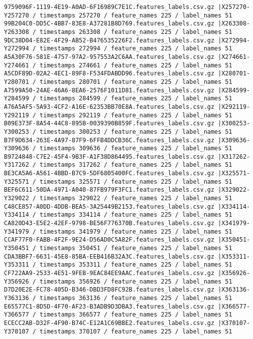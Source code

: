 \documentclass{UoNMCHA}
\numberwithin{equation}{section}
\begin{document}
\begin{lstlisting}
9759096F-1119-4E19-A0AD-6F16989C7E1C.features_labels.csv.gz |X257270-Y257270 / timestamps 257270 / feature_names 225 / label_names 51
99B204C0-DD5C-4BB7-83E8-A37281B8D769.features_labels.csv.gz |X263308-Y263308 / timestamps 263308 / feature_names 225 / label_names 51
9DC38D04-E82E-4F29-AB52-B476535226F2.features_labels.csv.gz |X272994-Y272994 / timestamps 272994 / feature_names 225 / label_names 51
A5A30F76-581E-4757-97A2-957553A2C6AA.features_labels.csv.gz |X274661-Y274661 / timestamps 274661 / feature_names 225 / label_names 51
A5CDF89D-02A2-4EC1-89F8-F534FDABDD96.features_labels.csv.gz |X280701-Y280701 / timestamps 280701 / feature_names 225 / label_names 51
A7599A50-24AE-46A6-8EA6-2576F1011D81.features_labels.csv.gz |X284599-Y284599 / timestamps 284599 / feature_names 225 / label_names 51
A76A5AF5-5A93-4CF2-A16E-62353BB70E8A.features_labels.csv.gz |X292119-Y292119 / timestamps 292119 / feature_names 225 / label_names 51
B09E373F-8A54-44C8-895B-0039390B859F.features_labels.csv.gz |X300253-Y300253 / timestamps 300253 / feature_names 225 / label_names 51
B7F9D634-263E-4A97-87F9-6FFB4DDCB36C.features_labels.csv.gz |X309636-Y309636 / timestamps 309636 / feature_names 225 / label_names 51
B9724848-C7E2-45F4-9B3F-A1F38D864495.features_labels.csv.gz |X317262-Y317262 / timestamps 317262 / feature_names 225 / label_names 51
BE3CA5A6-A561-4BBD-B7C9-5DF6805400FC.features_labels.csv.gz |X325571-Y325571 / timestamps 325571 / feature_names 225 / label_names 51
BEF6C611-50DA-4971-A040-87FB979F3FC1.features_labels.csv.gz |X329022-Y329022 / timestamps 329022 / feature_names 225 / label_names 51
C48CE857-A0DD-4DDB-BEA5-3A25449B2153.features_labels.csv.gz |X334114-Y334114 / timestamps 334114 / feature_names 225 / label_names 51
CA820D43-E5E2-42EF-9798-BE56F776370B.features_labels.csv.gz |X341979-Y341979 / timestamps 341979 / feature_names 225 / label_names 51
CCAF77F0-FABB-4F2F-9E24-D56AD0C5A82F.features_labels.csv.gz |X350451-Y350451 / timestamps 350451 / feature_names 225 / label_names 51
CDA3BBF7-6631-45E8-85BA-EEB416B32A3C.features_labels.csv.gz |X353311-Y353311 / timestamps 353311 / feature_names 225 / label_names 51
CF722AA9-2533-4E51-9FEB-9EAC84EE9AAC.features_labels.csv.gz |X356926-Y356926 / timestamps 356926 / feature_names 225 / label_names 51
D7D20E2E-FC78-405D-B346-DBD3FD8FC92B.features_labels.csv.gz |X363136-Y363136 / timestamps 363136 / feature_names 225 / label_names 51
E65577C1-8D5D-4F70-AF23-B3ADB9D3DBA3.features_labels.csv.gz |X366577-Y366577 / timestamps 366577 / feature_names 225 / label_names 51
ECECC2AB-D32F-4F90-B74C-E12A1C69BBE2.features_labels.csv.gz |X370107-Y370107 / timestamps 370107 / feature_names 225 / label_names 51

\end{lstlisting}
\end{document}
